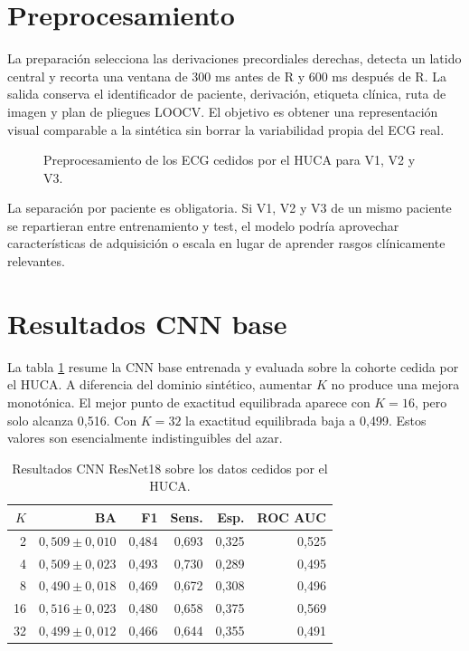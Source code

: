 \section{Preprocesamiento}

La preparación selecciona las derivaciones precordiales derechas, detecta un latido central y recorta una ventana de 300 ms antes de R y 600 ms después de R. La salida conserva el identificador de paciente, derivación, etiqueta clínica, ruta de imagen y plan de pliegues LOOCV. El objetivo es obtener una representación visual comparable a la sintética sin borrar la variabilidad propia del ECG real.

\begin{figure}[H]
  \centering
  \caption{Preprocesamiento de los ECG cedidos por el HUCA para V1, V2 y V3.}
  \label{fig:huca_preprocesado}
\end{figure}

La separación por paciente es obligatoria. Si V1, V2 y V3 de un mismo paciente se repartieran entre entrenamiento y test, el modelo podría aprovechar características de adquisición o escala en lugar de aprender rasgos clínicamente relevantes.

\section{Resultados CNN base}

La tabla \ref{tab:huca_baseline_final} resume la CNN base entrenada y evaluada sobre la cohorte cedida por el HUCA. A diferencia del dominio sintético, aumentar \(K\) no produce una mejora monotónica. El mejor punto de exactitud equilibrada aparece con \(K=16\), pero solo alcanza 0,516. Con \(K=32\) la exactitud equilibrada baja a 0,499. Estos valores son esencialmente indistinguibles del azar.

\begin{table}[H]
  \centering
  \small
  \begin{tabular}{rrrrrr}
    \toprule
    \(K\) & BA & F1 & Sens. & Esp. & ROC AUC \\
    \midrule
    2  & \(0,509 \pm 0,010\) & 0,484 & 0,693 & 0,325 & 0,525 \\
    4  & \(0,509 \pm 0,023\) & 0,493 & 0,730 & 0,289 & 0,495 \\
    8  & \(0,490 \pm 0,018\) & 0,469 & 0,672 & 0,308 & 0,496 \\
    16 & \(0,516 \pm 0,023\) & 0,480 & 0,658 & 0,375 & 0,569 \\
    32 & \(0,499 \pm 0,012\) & 0,466 & 0,644 & 0,355 & 0,491 \\
    \bottomrule
  \end{tabular}
  \caption{Resultados CNN ResNet18 sobre los datos cedidos por el HUCA.}
  \label{tab:huca_baseline_final}
\end{table}

